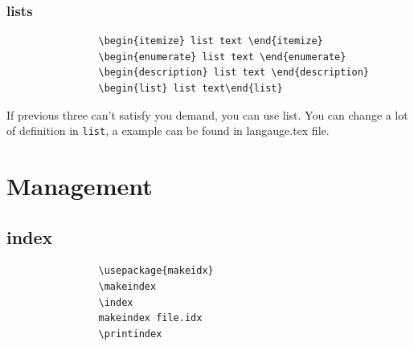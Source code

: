 \documentclass[a4paper,12pt,twoside]{book}
\begin{document}
		\subsubsection{lists}
			\begin{verbatim}
				\begin{itemize} list text \end{itemize}
				\begin{enumerate} list text \end{enumerate}
				\begin{description} list text \end{description}
				\begin{list} list text\end{list}
			\end{verbatim}	

			If previous three can't satisfy you demand, you can use list. You can change a lot of definition in \verb=list=, a example can be found in langauge.tex file.
\section{Management}	
	\subsection{index}
			\begin{verbatim}
				\usepackage{makeidx}
				\makeindex
				\index
				makeindex file.idx
				\printindex
			\end{verbatim}	
\end{document}
